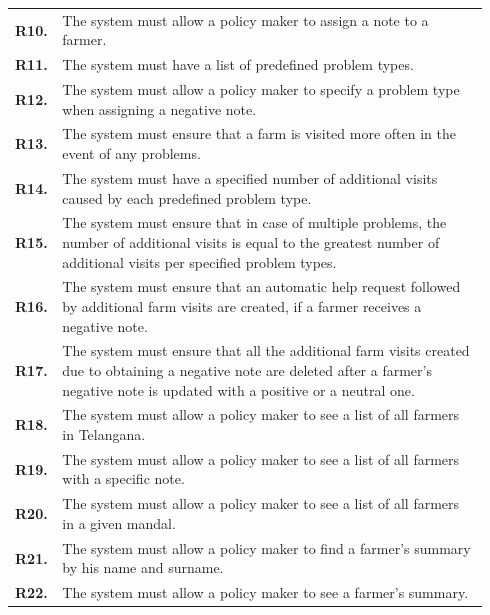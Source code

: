\begin{longtable}{@{}p{0.06\linewidth} p{0.88\linewidth}}
		\textbf{R10.} & The system must allow a policy maker to assign a note to a farmer.\\
		\textbf{R11.} & The system must have a list of predefined problem types.\\
        \textbf{R12.} & The system must allow a policy maker to specify a problem type when assigning a negative note.\\
        \textbf{R13.} & The system must ensure that a farm is visited more often in the event of any problems.\\
        \textbf{R14.} & The system must have a specified number of additional visits caused by each predefined problem type.\\
        \textbf{R15.} & The system must ensure that in case of multiple problems, the number of additional visits is equal to the greatest number of additional visits per specified problem types.\\
		\textbf{R16.} & The system must ensure that an automatic help request followed by additional farm visits are created, if a farmer receives a negative note.\\
		\textbf{R17.} & The system must ensure that all the additional farm visits created due to obtaining a negative note are deleted after a farmer's negative note is updated with a positive or a neutral one.\\
		\textbf{R18.} & The system must allow a policy maker to see a list of all farmers in Telangana.\\
		\textbf{R19.} & The system must allow a policy maker to see a list of all farmers with a specific note.\\
		\textbf{R20.} & The system must allow a policy maker to see a list of all farmers in a given mandal.\\
		\textbf{R21.} & The system must allow a policy maker to find a farmer's summary by his name and surname.\\
		\textbf{R22.} & The system must allow a policy maker to see a farmer's summary.\\
		

\end{longtable}
